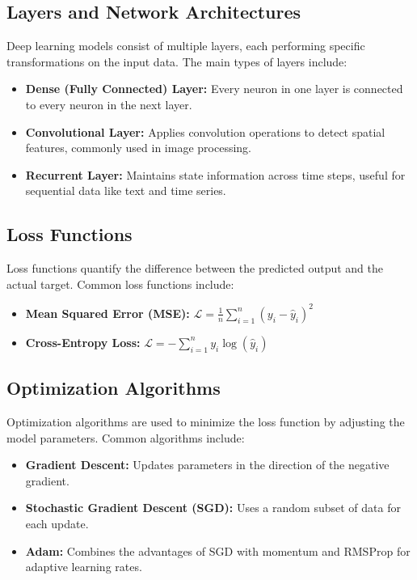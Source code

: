 \subsection{Layers and Network Architectures}
Deep learning models consist of multiple layers, each performing specific transformations on the input data. The main types of layers include:
\begin{itemize}
    \item \textbf{Dense (Fully Connected) Layer:} Every neuron in one layer is connected to every neuron in the next layer.
    \item \textbf{Convolutional Layer:} Applies convolution operations to detect spatial features, commonly used in image processing.
    \item \textbf{Recurrent Layer:} Maintains state information across time steps, useful for sequential data like text and time series.
\end{itemize}

\subsection{Loss Functions}
Loss functions quantify the difference between the predicted output and the actual target. Common loss functions include:
\begin{itemize}
    \item \textbf{Mean Squared Error (MSE):} \( \mathcal{L} = \frac{1}{n} \sum_{i=1}^n (y_i - \hat{y}_i)^2 \)
    \item \textbf{Cross-Entropy Loss:} \( \mathcal{L} = -\sum_{i=1}^n y_i \log(\hat{y}_i) \)
\end{itemize}

\subsection{Optimization Algorithms}
Optimization algorithms are used to minimize the loss function by adjusting the model parameters. Common algorithms include:
\begin{itemize}
    \item \textbf{Gradient Descent:} Updates parameters in the direction of the negative gradient.
    \item \textbf{Stochastic Gradient Descent (SGD):} Uses a random subset of data for each update.
    \item \textbf{Adam:} Combines the advantages of SGD with momentum and RMSProp for adaptive learning rates.
\end{itemize}

